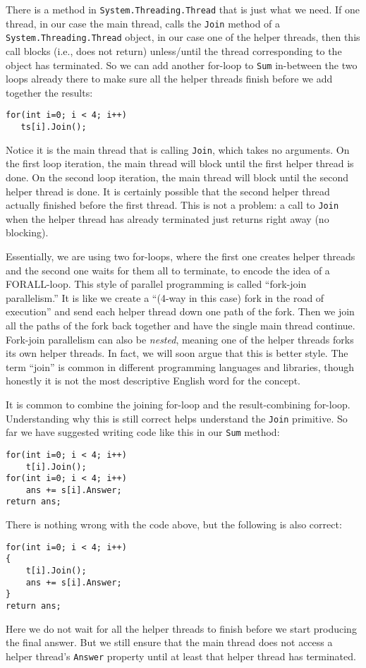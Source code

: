 \documentclass[10pt]{article}
\begin{document}
There is a method in {\tt System.Threading.Thread} that is just what 
we need. If one thread, in our case the main thread, calls the {\tt Join} 
method of a {\tt System.Threading.Thread} object, in our case one of 
the helper threads, then this call blocks (i.e., does not return) unless/until 
the thread corresponding to the object has terminated. So we can add 
another for-loop to {\tt Sum} in-between the two loops already there 
to make sure all the helper threads finish before we add together the results:
\begin{verbatim}
for(int i=0; i < 4; i++)
   ts[i].Join();
\end{verbatim}
Notice it is the main thread that is calling {\tt Join}, which takes
no arguments.  On the first loop iteration, the main thread will block
until the first helper thread is done.  On the second loop iteration,
the main thread will block until the second helper thread is done.  It
is certainly possible that the second helper thread actually finished
before the first thread.  This is not a problem: a call to {\tt Join}
when the helper thread has already terminated just returns right away
(no blocking).

Essentially, we are using two for-loops, where the first one creates
helper threads and the second one waits for them all to terminate, to
encode the idea of a FORALL-loop.  This style of parallel programming
is called ``fork-join parallelism.''  It is like we create a ``(4-way
in this case) fork in the road of execution'' and send each helper
thread down one path of the fork.  Then we join all the paths of the
fork back together and have the single main thread continue.
Fork-join parallelism can also be \emph{nested}, meaning one of the
helper threads forks its own helper threads.  In fact, we will soon
argue that this is better style.  The term ``join'' is common
in different programming languages and libraries, though honestly it
is not the most descriptive English word for the concept.

It is common to combine the joining for-loop and the
result-combining for-loop. Understanding why this is still correct
helps understand the {\tt Join} primitive.  So far we have suggested
writing code like this in our {\tt Sum} method:
\goodbreak
\begin{verbatim}
for(int i=0; i < 4; i++)
    t[i].Join();
for(int i=0; i < 4; i++)
    ans += s[i].Answer;
return ans;
\end{verbatim}
There is nothing wrong with the code above, but the following is also
correct:
\begin{verbatim}
for(int i=0; i < 4; i++)
{
    t[i].Join();
    ans += s[i].Answer;
}
return ans;
\end{verbatim}
Here we do not wait for all the helper threads to finish before we
start producing the final answer.  But we still ensure that the main
thread does not access a helper thread's {\tt Answer} property until at least that
helper thread has terminated.
\end{document}
